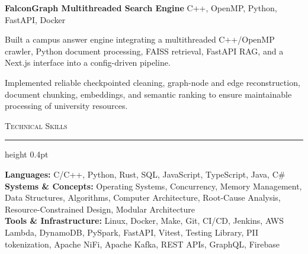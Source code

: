 \documentclass[letterpaper,11pt]{article}
\newcommand{\resumesection}[1]{%
  \par\vspace{2pt}%
  {\large\scshape #1}\par\vspace{2pt}%
  \hrule height 0.4pt\vspace{2pt}%
}
\newcommand{\projectHeading}[2]{
  \textbf{#1} \hfill #2
}
\begin{document}
\projectHeading{FalconGraph Multithreaded Search Engine}{C++, OpenMP, Python, FastAPI, Docker}
\begin{tightitemize}
  \item Built a campus answer engine integrating a multithreaded C++/OpenMP crawler, Python document processing, FAISS retrieval, FastAPI RAG, and a Next.js interface into a config-driven pipeline.
  \item Implemented reliable checkpointed cleaning, graph-node and edge reconstruction, document chunking, embeddings, and semantic ranking to ensure maintainable processing of university resources.
\end{tightitemize}

\resumesection{Technical Skills}
\textbf{Languages:} C/C++, Python, Rust, SQL, JavaScript, TypeScript, Java, C\#\\
\textbf{Systems \& Concepts:} Operating Systems, Concurrency, Memory Management, Data Structures, Algorithms, Computer Architecture, Root-Cause Analysis, Resource-Constrained Design, Modular Architecture\\
\textbf{Tools \& Infrastructure:} Linux, Docker, Make, Git, CI/CD, Jenkins, AWS Lambda, DynamoDB, PySpark, FastAPI, Vitest, Testing Library, PII tokenization, Apache NiFi, Apache Kafka, REST APIs, GraphQL, Firebase

\vspace{10pt}
\end{document}
